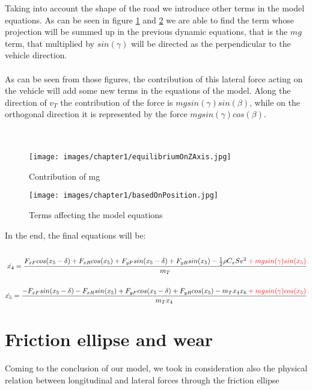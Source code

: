 \documentclass{report}
\let\Oldsection\section
\renewcommand{\section}{\FloatBarrier\Oldsection}
\begin{document}
Taking into account the shape of the road we introduce other terms in the model equations. As can be seen in figure \ref{fig:contribmg} and \ref{fig:basedonpos} we are able to find the term whose projection will be summed up in the previous dynamic equations, that is the $mg$ term, that multiplied by $sin(\gamma)$ will be directed as the perpendicular to the vehicle direction.\\\\ 
As can be seen from those figures, the contribution of this lateral force acting on the vehicle will add some new terms in the equations of the model.
Along the direction of $v_T$ the contribution of the force is \color{red} $mgsin(\gamma)sin(\beta)$\color{black}, while on the orthogonal direction it is
represented by the force \color{red} $mgsin(\gamma)cos(\beta)$\color{black}.\\\\
\\
\begin{figure}[h!]
    \centering
    \texttt{[image: images/chapter1/equilibriumOnZAxis.jpg]}
    \caption{Contribution of mg}
    \label{fig:contribmg}
\end{figure}
\begin{figure}[h!]
    \centering
    \texttt{[image: images/chapter1/basedOnPosition.jpg]}
    \caption{Terms affecting the model equations}
    \label{fig:basedonpos}
\end{figure}

In the end, the final equations will be:
\begin{equation}
\begin{aligned}
\\
\dot{x_4} = \frac{F_{xF} cos(x_5-\delta) + F_{xR} cos(x_5) + F_{yF} sin(x_5-\delta) + F_{yR} sin(x_5) -\frac{1}{2} \rho C_x S v^2 \color{red} + mgsin(\gamma) sin(x_5) \color{black}}{m_T} \\
\\
\dot{x_5} = \frac{-F_{xF} sin(x_5-\delta) - F_{xR} sin(x_5) + F_{yF} cos(x_5-\delta) + F_{yR} cos(x_5) - m_T x_4 x_6 \color{red} + mgsin(\gamma) cos(x_5) \color{black}}{m_T x_4} \\
\end{aligned}
\end{equation}


\section{Friction ellipse and wear}
Coming to the conclusion of our model, we took in consideration also the physical relation between longitudinal and lateral forces through the friction ellipse
\end{document}
